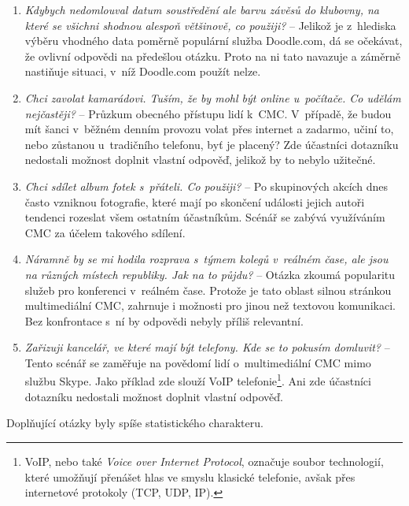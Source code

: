 \documentclass[12pt,oneside,final]{fithesis2}
\begin{document}
\begin{enumerate}
    \item \emph{Kdybych nedomlouval datum soustředění ale barvu závěsů do klubovny, na které se všichni shodnou alespoň většinově, co použiji?} --
        Jelikož je z~hlediska výběru vhodného data poměrně populární služba Doodle.com, dá se očekávat, že ovlivní odpovědi na předešlou otázku. Proto na ni tato navazuje a záměrně nastiňuje situaci, v~níž Doodle.com použít nelze.

    \item \emph{Chci zavolat kamarádovi. Tuším, že by mohl být online u~počítače. Co udělám nejčastěji?} --
        Průzkum obecného přístupu lidí k~CMC. V~případě, že budou mít šanci v~běžném denním provozu volat přes internet a zadarmo, učiní to, nebo zůstanou u~tradičního telefonu, byť je placený? Zde účastníci dotazníku nedostali možnost doplnit vlastní odpověď, jelikož by to nebylo užitečné.

    \item \emph{Chci sdílet album fotek s~přáteli. Co použiji?} --
        Po skupinových akcích dnes často vzniknou fotografie, které mají po skončení události jejich autoři tendenci rozeslat všem ostatním účastníkům. Scénář se zabývá využíváním CMC za účelem takového sdílení.

    \item \emph{Náramně by se mi hodila rozprava s~týmem kolegů v~reálném čase, ale jsou na různých místech republiky. Jak na to půjdu?} --
        Otázka zkoumá popularitu služeb pro konferenci v~reálném čase. Protože je tato oblast silnou stránkou multimediální CMC, zahrnuje i možnosti pro jinou než textovou komunikaci. Bez konfrontace s~ní by odpovědi nebyly příliš relevantní.

    \item \emph{Zařizuji kancelář, ve které mají být telefony. Kde se to pokusím domluvit?} --
        Tento scénář se zaměřuje na povědomí lidí o~multimediální CMC mimo službu Skype. Jako příklad zde slouží VoIP telefonie\footnote{VoIP, nebo také \emph{Voice over Internet Protocol}, označuje soubor technologií, které umožňují přenášet hlas ve smyslu klasické telefonie, avšak přes internetové protokoly (TCP, UDP, IP).}. Ani zde účastníci dotazníku nedostali možnost doplnit vlastní odpověď.
\end{enumerate}

Doplňující otázky byly spíše statistického charakteru.
\end{document}
